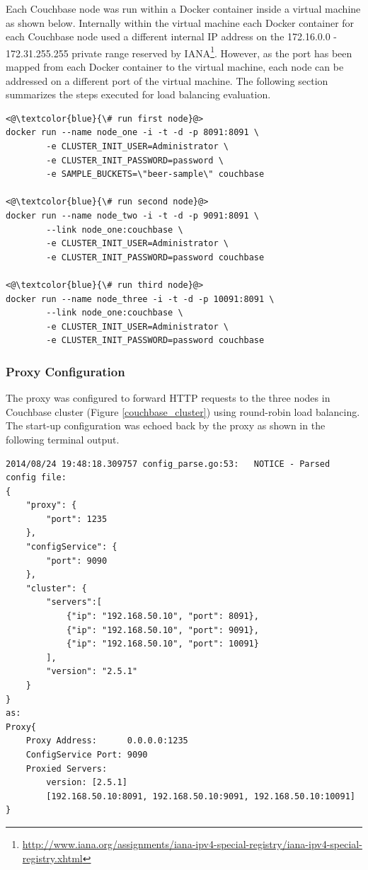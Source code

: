 \documentclass[a4paper,11pt,twoside]{report}
\begin{document}
Each Couchbase node was run within a Docker container inside a virtual machine as shown below. Internally within the virtual machine each Docker container for each Couchbase node used a different internal IP address on the 172.16.0.0 - 172.31.255.255 private range reserved by IANA\footnote{\label{IANA} \url{http://www.iana.org/assignments/iana-ipv4-special-registry/iana-ipv4-special-registry.xhtml}}.  However, as the port has been mapped from each Docker container to the virtual machine, each node can be addressed on a different port of the virtual machine. The following section summarizes the steps executed for load balancing evaluation. \bigskip

\begin{lstlisting}[language=terminal]
<@\textcolor{blue}{\# run first node}@>
docker run --name node_one -i -t -d -p 8091:8091 \
		-e CLUSTER_INIT_USER=Administrator \
		-e CLUSTER_INIT_PASSWORD=password \
		-e SAMPLE_BUCKETS=\"beer-sample\" couchbase

<@\textcolor{blue}{\# run second node}@>
docker run --name node_two -i -t -d -p 9091:8091 \
		--link node_one:couchbase \
		-e CLUSTER_INIT_USER=Administrator \
		-e CLUSTER_INIT_PASSWORD=password couchbase

<@\textcolor{blue}{\# run third node}@>
docker run --name node_three -i -t -d -p 10091:8091 \
		--link node_one:couchbase \
		-e CLUSTER_INIT_USER=Administrator \
		-e CLUSTER_INIT_PASSWORD=password couchbase
\end{lstlisting}


\subsubsection*{Proxy Configuration} 
The proxy was configured to forward HTTP requests to the three nodes in Couchbase cluster (Figure \ref{couchbase_cluster}) using round-robin load balancing. The start-up configuration was echoed back by the proxy as shown in the following terminal output.\bigskip
\begin{lstlisting}[language=terminal]
2014/08/24 19:48:18.309757 config_parse.go:53:   NOTICE - Parsed config file:
{
    "proxy": {
        "port": 1235
    },
    "configService": {
        "port": 9090
    },
    "cluster": {
        "servers":[
            {"ip": "192.168.50.10", "port": 8091},
            {"ip": "192.168.50.10", "port": 9091},
            {"ip": "192.168.50.10", "port": 10091}
        ],
        "version": "2.5.1"
    }
}
as:
Proxy{
	Proxy Address:      0.0.0.0:1235
	ConfigService Port: 9090
	Proxied Servers:    
		version: [2.5.1] 
		[192.168.50.10:8091, 192.168.50.10:9091, 192.168.50.10:10091]
}
\end{lstlisting}
\end{document}

